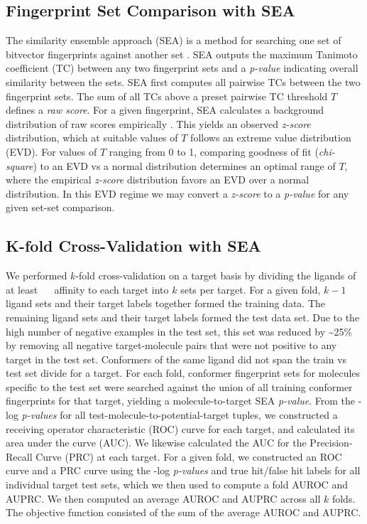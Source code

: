 \documentclass[../../main.tex]{subfiles}
\begin{document}
\begin{refsection}
	\subsection*{Fingerprint Set Comparison with SEA}

	The similarity ensemble approach (SEA) is a method for searching one set of bitvector fingerprints against another set \supercite{keiser_2007}.
	SEA outputs the maximum Tanimoto coefficient (TC) between any two fingerprint sets and a \emph{p-value} indicating overall similarity between the sets.
	SEA first computes all pairwise TCs between the two fingerprint sets.
	The sum of all TCs above a preset pairwise TC threshold $T$ defines a \emph{raw score}.
	For a given fingerprint, SEA calculates a background distribution of raw scores empirically  \supercite{keiser_2007}.
	This yields an observed \emph{z-score} distribution, which at suitable values of $T$ follows an extreme value distribution (EVD).
	For values of $T$ ranging from 0 to 1, comparing goodness of fit (\emph{chi-square}) to an EVD vs a normal distribution determines an optimal range of $T$, where the empirical \emph{z-score} distribution favors an EVD over a normal distribution.
	In this EVD regime we may convert a \emph{z-score} to a  \emph{p-value} for any given set-set comparison.

	\subsection*{K-fold Cross-Validation with SEA}

	We performed $k$-fold cross-validation on a target basis by dividing the ligands of at least \SI{}{\micro\molar} affinity to each target into  $k$ sets per target.
	For a given fold, $k-1$ ligand sets and their target labels together formed the training data.
	The remaining ligand sets and their target labels formed the test data set.
	Due to the high number of negative examples in the test set, this set was reduced by \textasciitilde{}25\% by removing all negative target-molecule pairs that were not positive to any target in the test set.
	Conformers of the same ligand did not span the train vs test set divide for a target.
	For each fold, conformer fingerprint sets for molecules specific to the test set were searched against the union of all training conformer fingerprints for that target, yielding a molecule-to-target SEA  \emph{p-value}.
	From the -log \emph{p-values} for all test-molecule-to-potential-target tuples, we constructed a receiving operator characteristic (ROC) curve for each target, and calculated its area under the curve (AUC).
	We likewise calculated the AUC for the Precision-Recall Curve (PRC) at each target.
	For a given fold, we constructed an ROC curve and a PRC curve using the -log \emph{p-values}
	and true hit/false hit labels for all individual target test sets, which we then used to compute a fold AUROC and AUPRC.
	We then computed an average AUROC and AUPRC across all $k$ folds.
	The objective function \AUCsum{} consisted of the sum of the average AUROC and AUPRC.


\end{refsection}
\end{document}
